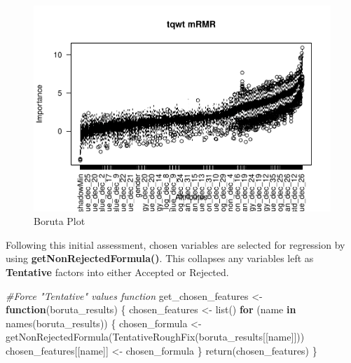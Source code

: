 \documentclass[
]{article}
\newenvironment{Shaded}{\begin{snugshade}}{\end{snugshade}}
\newcommand{\CommentTok}[1]{\textcolor[rgb]{0.56,0.35,0.01}{\textit{#1}}}
\newcommand{\ControlFlowTok}[1]{\textcolor[rgb]{0.13,0.29,0.53}{\textbf{#1}}}
\newcommand{\FunctionTok}[1]{\textcolor[rgb]{0.00,0.00,0.00}{#1}}
\newcommand{\NormalTok}[1]{#1}
\newcommand{\OtherTok}[1]{\textcolor[rgb]{0.56,0.35,0.01}{#1}}
\begin{document}
\begin{landscape}
\begin{figure}
{\centering \includegraphics[width=1\linewidth,height=1\textheight]{figure/borutaPlot-7} 

}

\caption{\label{fig:borutaPlot}Boruta Plot}\label{fig:borutaPlot-7}
\end{figure}

\end{landscape}

\newpage

Following this initial assessment, chosen variables are selected for regression by using \textbf{getNonRejectedFormula()}. This collapses any variables left as \textbf{Tentative} factors into either Accepted or Rejected.

\begin{Shaded}
\begin{Highlighting}[]
\CommentTok{\#Force "Tentative" values function}
\NormalTok{get\_chosen\_features }\OtherTok{\textless{}{-}} \ControlFlowTok{function}\NormalTok{(boruta\_results) \{}
\NormalTok{  chosen\_features }\OtherTok{\textless{}{-}} \FunctionTok{list}\NormalTok{()}
  \ControlFlowTok{for}\NormalTok{ (name }\ControlFlowTok{in} \FunctionTok{names}\NormalTok{(boruta\_results)) \{}
\NormalTok{    chosen\_formula }\OtherTok{\textless{}{-}} \FunctionTok{getNonRejectedFormula}\NormalTok{(}\FunctionTok{TentativeRoughFix}\NormalTok{(boruta\_results[[name]]))}
\NormalTok{    chosen\_features[[name]] }\OtherTok{\textless{}{-}}\NormalTok{ chosen\_formula}
\NormalTok{  \}}
  \FunctionTok{return}\NormalTok{(chosen\_features)}
\NormalTok{\}}
\end{Highlighting}
\end{Shaded}
\end{document}
